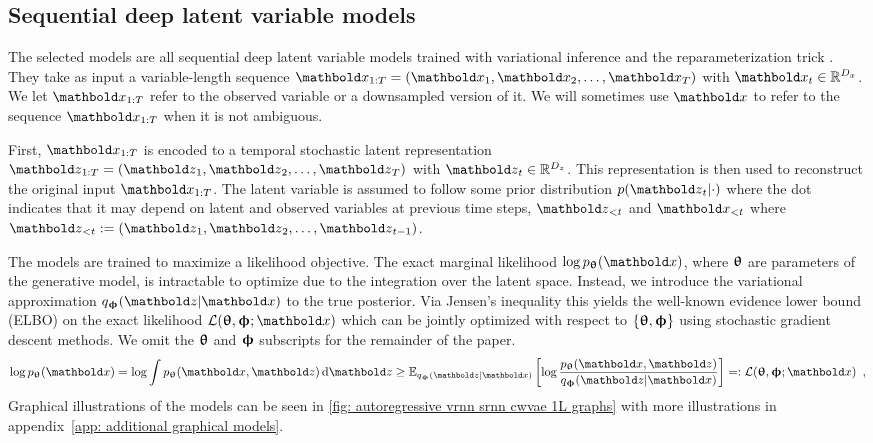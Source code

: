 {\subsection{Sequential deep latent variable models}
The selected models are all sequential deep latent variable models trained with variational inference and the reparameterization trick \cite{kingma_autoencoding_2014}.
They take as input a variable-length sequence $\xb_{1:T} = \left(\xb_1, \xb_2, \dots, \xb_{T}\right)$ with $\xb_t \in \mathbb{R}^{D_x}$. 
We let $\xb_{1:T}$ refer to the observed variable or a downsampled version of it. We will sometimes use $\xb$ to refer to the sequence $\xb_{1:T}$ when it is not ambiguous.

First, $\xb_{1:T}$ is encoded to a temporal stochastic latent representation $\zb_{1:T} = \left( \zb_1, \zb_2, \dots, \zb_{T} \right)$ with $\zb_t\in \mathbb{R}^{D_z}$. This representation is then used to reconstruct the original input $\xb_{1:T}$.
The latent variable is assumed to follow some prior distribution $p(\zb_t|\cdot)$ where the dot indicates that it may depend on latent and observed variables at previous time steps, $\zb_{<t}$ and $\xb_{<t}$ where $\zb_{<t} := \left( \zb_1, \zb_2, \dots, \zb_{t-1} \right)$. 

The models are trained to maximize a likelihood objective. The exact marginal likelihood $\log p_\thetab(\xb)$, where ${\boldsymbol{\uptheta}}$ are parameters of the generative model, is intractable to optimize due to the integration over the latent space. Instead, we introduce the variational approximation $q_\phib(\zb|\xb)$ to the true posterior. Via Jensen's inequality this yields the well-known evidence lower bound (ELBO) on the exact likelihood $\mathcal{L}(\thetab,\phib;\xb)$
which can be jointly optimized with respect to  $\{{\boldsymbol{\uptheta}}, {\boldsymbol{\upphi}}\}$ using stochastic gradient descent methods. We omit the ${\boldsymbol{\uptheta}}$ and ${\boldsymbol{\upphi}}$ subscripts for the remainder of the paper.
\begin{equation}
    \log p_\thetab(\xb) = \log \int p_\thetab(\xb,\zb) \, \mathrm{d}\zb  \geq \mathbb{E}_{q_\phib(\zb|\xb)} \left[ \log \frac{p_\thetab(\xb,\zb)}{q_\phib(\zb|\xb)} \right] =: \mathcal{L}(\thetab,\phib;\xb) \label{eq: elbo} \enspace,
\end{equation}
Graphical illustrations of the models can be seen in \cref{fig: autoregressive vrnn srnn cwvae 1L graphs} with more illustrations in appendix~\cref{app: additional graphical models}.


}
